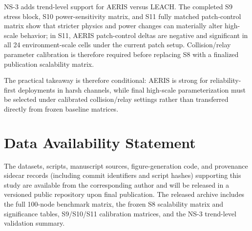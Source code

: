 ﻿\documentclass[sensors,article,submit,moreauthors,pdftex]{Definitions/mdpi}
\begin{document}
NS-3 adds trend-level support for AERIS versus LEACH. The completed S9 stress block, S10 power-sensitivity matrix, and S11 fully matched patch-control matrix show that stricter physics and power changes can materially alter high-scale behavior; in S11, AERIS patch-control deltas are negative and significant in all 24 environment-scale cells under the current patch setup. Collision/relay parameter calibration is therefore required before replacing S8 with a finalized publication scalability matrix.

The practical takeaway is therefore conditional: AERIS is strong for reliability-first deployments in harsh channels, while final high-scale parameterization must be selected under calibrated collision/relay settings rather than transferred directly from frozen baseline matrices.

\section*{Data Availability Statement}
The datasets, scripts, manuscript sources, figure-generation code, and provenance sidecar records (including commit identifiers and script hashes) supporting this study are available from the corresponding author and will be released in a versioned public repository upon final publication. The released archive includes the full 100-node benchmark matrix, the frozen S8 scalability matrix and significance tables, S9/S10/S11 calibration matrices, and the NS-3 trend-level validation summary.


\end{document}
